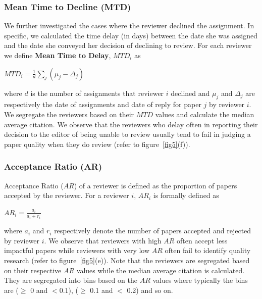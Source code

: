 \subsubsection{Mean Time to Decline (MTD)}

We further investigated the cases where the reviewer declined the assignment. In specific, we calculated the time delay (in days) 
between the date she was assigned and the date she conveyed her decision of declining to review. For each reviewer we define {\bf Mean Time to Delay}, $MTD_{i}$ as 

\begin{center}
$MTD_{i}= \frac{1}{d}\sum \limits_{j}(\mu_{j} - \Delta_{j})$
\end{center}

where $d$ is the number of assignments that reviewer $i$ declined and $\mu_{j}$ and $\Delta_{j}$ are respectively the date of assignments and date of reply for paper $j$ by reviewer $i$. We segregate the reviewers based on their $MTD$ values and calculate the median average citation. We observe that the reviewers who delay often in reporting their decision to the editor of being unable to review usually tend to fail in judging a paper quality when they do review (refer to figure~\ref{fig5}(f)).

\subsubsection{Acceptance Ratio (AR)}
Acceptance Ratio ($AR$) of a reviewer is defined as the proportion of papers accepted by the reviewer. For a reviewer $i$, $AR_{i}$ is formally defined as 

\begin{center}
$AR_{i}=\frac{a_{i}}{a_{i}+r_{i}}$
\end{center}

\noindent where $a_{i}$ and $r_{i}$ respectively denote the number of papers accepted and rejected by reviewer $i$. We observe that reviewers with high $AR$ often accept  less impactful papers while reviewers with very low $AR$ often fail to identify quality research (refer to figure~\ref{fig5}(e)). Note that the reviewers are segregated based on their respective $AR$ values while the median average citation is calculated. They are segregated into bins based on the $AR$ values where typically the bins are ($\geq$ 0 and $< 0.1$), ($\geq$ 0.1 and $<$ 0.2) and so on.

